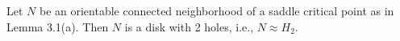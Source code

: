 Let $N$ be an orientable connected neighborhood of a saddle critical point as in Lemma 3.1(a). Then $N$ is a disk with 2 holes, i.e., $N \approx H_2$.
